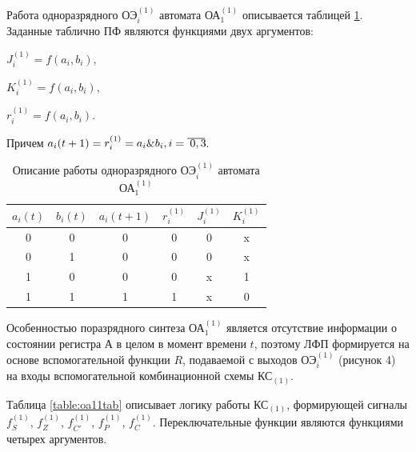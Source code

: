 Работа одноразрядного ОЭ$^{(1)}_i$ автомата  ОА$^{(1)}_{1}$ описывается таблицей \ref{table:oe}. Заданные таблично ПФ являются функциями двух аргументов:

$J^{(1)}_i = f(a_i, b_i)$,

$K^{(1)}_i = f(a_i, b_i)$,

$r^{(1)}_i = f(a_i, b_i)$.

Причем $a_i(t+1) = r^{(1)}_i = a_i \& b_i, i=\oline{0,3}$.

\begin{table}[H]
	\centering
	\caption{Описание работы одноразрядного ОЭ$^{(1)}_i$ автомата ОА$^{(1)}_{1}$}
	\label{table:oe}
	\begin{tabular}{| c | c | c | c | c | c |} \hline
		$a_i(t)$ & $b_i(t)$ & $a_i(t+1)$ & $r^{(1)}_i$ & $J^{(1)}_i$ & $K^{(1)}_i$ \\ \hline
		0 & 0 & 	0 & 	0 & 	0 & x \\ \hline
		0 & 1 & 	0 & 	0 & 	0 & x \\ \hline
		1 & 0 & 	0 & 	0 & 	x & 1 \\ \hline
		1 & 1 & 	1 & 	1 & 	x & 0 \\ \hline
	\end{tabular}
\end{table}

Особенностью поразрядного синтеза ОА$^{(1)}_{1}$ является отсутствие информации о состоянии регистра А в целом в момент времени $t$, поэтому ЛФП формируется на основе вспомогательной функции $R$, подаваемой с выходов ОЭ$^{(1)}_i$  (рисунок 4) на входы вспомогательной комбинационной схемы КС$_{(1)}$.

Таблица \ref{table:oa11tab} описывает логику работы КС$_{(1)}$, формирующей сигналы $f^{(1)}_{S}$, $f^{(1)}_{Z}$, $f^{(1)}_{C'}$, $f^{(1)}_{P}$, $f^{(1)}_{C}$. Переключательные функции являются функциями четырех аргументов.


